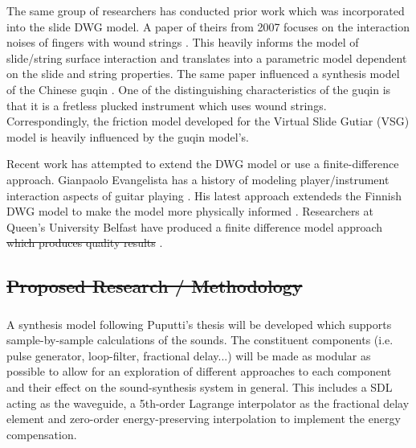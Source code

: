 \documentclass[12pt]{article}
\providecommand{\DIFadd}[1]{{\protect\color{blue}\uwave{#1}}} %
\providecommand{\DIFdel}[1]{{\protect\color{red}\sout{#1}}}                      %
\providecommand{\DIFaddbegin}{} %
\providecommand{\DIFaddend}{} %
\providecommand{\DIFdelbegin}{} %
\providecommand{\DIFdelend}{} %
\begin{document}
The same group of researchers has conducted prior work which was incorporated into the slide DWG model. A paper of theirs from 2007 focuses on the interaction noises of fingers with wound strings \cite{pakarinen_analysis_2007}. This heavily informs the model of slide/string surface interaction and translates into a parametric model dependent on the slide and string properties. The same paper influenced a synthesis model of the Chinese guqin \cite{penttinen_model-based_2006}. One of the distinguishing characteristics of the guqin is that it is a fretless plucked instrument which uses wound strings. Correspondingly, the friction model developed for the Virtual Slide Gutiar (VSG) model is heavily influenced by the guqin model's.

Recent work has attempted to extend the DWG model or use a finite-difference approach. Gianpaolo Evangelista has a history of modeling player/instrument interaction aspects of guitar playing \cite{evangelista_physical_2011} \cite{evangelista_playerinstrument_2010}. His latest approach extendeds the Finnish DWG model to make the model more physically informed \cite{evangelista_physical_2012}. Researchers at Queen’s University Belfast have produced a finite difference model approach \DIFdelbegin \DIFdel{which produces quality results }\DIFdelend \cite{bhanuprakash_finite_2020}.

\DIFdelbegin \subsection*{\DIFdel{Proposed Research / Methodology}}
\DIFdelend \DIFaddbegin \subsubsection*{\DIFadd{Proposed Research / Methodology}}
\DIFaddend \paragraph{}
A synthesis model following Puputti's thesis will be developed which supports sample-by-sample calculations of the sounds. The constituent components (i.e. pulse generator, loop-filter, fractional delay...) will be made as modular as possible to allow for an exploration of different approaches to each component and their effect on the sound-synthesis system in general. This includes a SDL acting as the waveguide, a 5th-order Lagrange interpolator as the fractional delay element and zero-order energy-preserving interpolation to implement the energy compensation.
\end{document}
